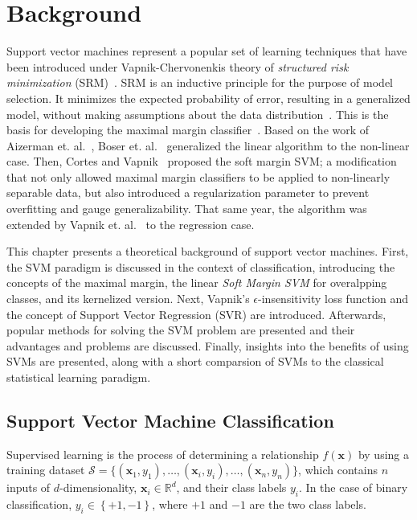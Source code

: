 \documentclass[reqno]{vcuthesis}
\newcommand{\set}[1]{{\left\{#1\right\}}}
\newcommand{\reals}{{\mathbb{R}}}
\numberwithin{equation}{chapter}
\begin{document}
\chapter{Background}\label{chap:background}
Support vector machines represent a popular set of learning techniques that have been introduced under Vapnik-Chervonenkis theory of \textit{structured risk minimization} (SRM)~\cite{boser1992training,Cortes1995,Kecman2001,Schoelkopf2002,Shalev2014}. SRM is an inductive principle for the purpose of model selection. It minimizes the expected probability of error, resulting in a generalized model, without making assumptions about the data distribution~\cite{Shalev2014,vapnik2015uniform}. This is the basis for developing the maximal margin classifier~\cite{vapnik2015uniform}. Based on the work of Aizerman et. al.~\cite{Aizerman67theoretical}, Boser et. al.~\cite{boser1992training} generalized the linear algorithm to the non-linear case. Then, Cortes and Vapnik~\cite{Cortes1995} proposed the soft margin SVM; a modification that not only allowed maximal margin classifiers to be applied to non-linearly separable data, but also introduced a regularization parameter to prevent overfitting and gauge generalizability. That same year, the algorithm was extended by Vapnik et. al.~\cite{vapnik2013nature} to the regression case.

This chapter presents a theoretical background of support vector machines. First, the SVM paradigm is discussed in the context of classification, introducing the concepts of the maximal margin, the linear \textit{Soft Margin SVM} for overalpping classes, and its kernelized version. Next, Vapnik's $\epsilon$-insensitivity loss function and the concept of Support Vector Regression (SVR) are introduced. Afterwards, popular methods for solving the SVM problem are presented and their advantages and problems are discussed. Finally, insights into the benefits of using SVMs are presented, along with a short comparsion of SVMs to the classical statistical learning paradigm.

\section{Support Vector Machine Classification}
Supervised learning is the process of determining a relationship $f(\bm x)$ by using a training dataset $\mathcal{S} = \{(\bm{x}_1,y_1),\ldots,(\bm{x}_i,y_i),\ldots,(\bm{x}_n,y_n)\}$, which contains $n$ inputs of $d$-dimensionality, $\bm x_i \in \reals^d$, and their class labels $y_i$. In the case of binary classification, $y_i \in \set{+1,-1}$, where $+1$ and $-1$ are the two class labels.
\end{document}
